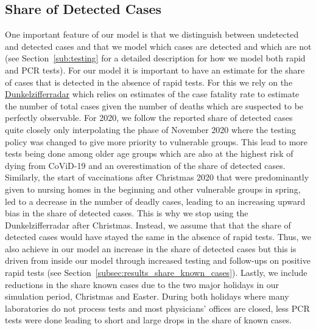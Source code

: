 \subsection{Share of Detected Cases}
\label{subsec:data_share_known_cases}


One important feature of our model is that we distinguish between undetected and detected
cases and that we model which cases are detected and which are not (see
Section~\ref{sub:testing} for a detailed description for how we model both rapid and PCR
tests). For our model it is important to have an estimate for the share of cases that is
detected in the absence of rapid tests. For this we rely on the
\href{https://covid19.dunkelzifferradar.de/}{Dunkelzifferradar} which relies on estimates
of the case fatality rate to estimate the number of total cases given the number of
deaths which are suspected to be perfectly observable. For 2020, we follow the reported
share of detected cases quite closely only interpolating the phase of November 2020 where
the testing policy was changed to give more priority to vulnerable groups. This lead to
more tests being done among older age groups which are also at the highest risk of dying
from CoViD-19 and an overestimation of the share of detected cases.%
Similarly, the start of vaccinations after Christmas 2020 that were predominantly given
to nursing homes in the beginning and other vulnerable groups in spring, led to a
decrease in the number of deadly cases, leading to an increasing upward bias in the share
of detected cases. This is why we stop using the Dunkelzifferradar after Christmas.
Instead, we assume that that the share of detected cases would have stayed the same in
the absence of rapid tests. Thus, we also achieve in our model an increase in the share
of detected cases but this is driven from inside our model through increased testing and
follow-ups on positive rapid tests (see Section~\ref{subsec:results_share_known_cases}).
Lastly, we include reductions in the share known cases due to the two major holidays in
our simulation period, Christmas and Easter. During both holidays where many laboratories
do not process tests and most physicians' offices are closed, less PCR tests were done
leading to short and large drops in the share of known cases.

